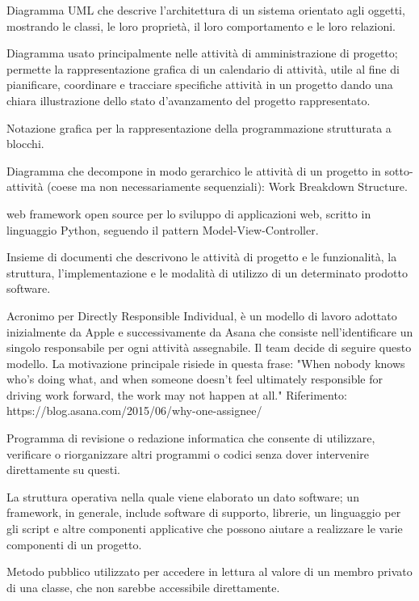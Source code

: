 \item[diagramma delle classi] Diagramma UML che descrive l'architettura di un sistema orientato agli oggetti, mostrando le classi, le loro proprietà, il loro comportamento e le loro relazioni.
\item[diagramma di Gantt] Diagramma usato principalmente nelle attività di amministrazione di progetto; permette la rappresentazione grafica di un calendario di attività, utile al fine di pianificare, coordinare e tracciare specifiche attività in un progetto dando una chiara illustrazione dello stato d’avanzamento del progetto rappresentato.
\item[diagramma Nassi–Shneiderman] Notazione grafica per la rappresentazione della programmazione strutturata a blocchi. 
\item[diagramma WBS] Diagramma che decompone in modo gerarchico le attività di un progetto in sotto-attività (coese ma non necessariamente sequenziali): Work Breakdown Structure.
\item[Django] web framework open source per lo sviluppo di applicazioni web, scritto in linguaggio Python, seguendo il pattern Model-View-Controller.
\item[documentazione] Insieme di documenti che descrivono le attività di progetto e le funzionalità, la struttura, l'implementazione e le modalità di utilizzo di un determinato prodotto software. 
\item[DRI] Acronimo per Directly Responsible Individual, è un modello di lavoro adottato inizialmente da Apple e successivamente da Asana che consiste nell'identificare un singolo responsabile per ogni attività assegnabile. Il team decide di seguire questo modello. La motivazione principale risiede in questa frase: "When nobody knows who’s doing what, and when someone doesn’t feel ultimately responsible for driving work forward, the work may not happen at all." Riferimento: https://blog.asana.com/2015/06/why-one-assignee/ 
\item[editor] Programma di revisione o redazione informatica che consente di utilizzare, verificare o riorganizzare altri programmi o codici senza dover intervenire direttamente su questi.
\item[framework]  La struttura operativa nella quale viene elaborato un dato software; un framework, in generale, include software di supporto, librerie, un linguaggio per gli script e altre componenti applicative che possono aiutare a realizzare le varie componenti di un progetto.
\item[getter] Metodo pubblico utilizzato per accedere in lettura al valore di un membro privato di una classe, che non sarebbe accessibile direttamente.
